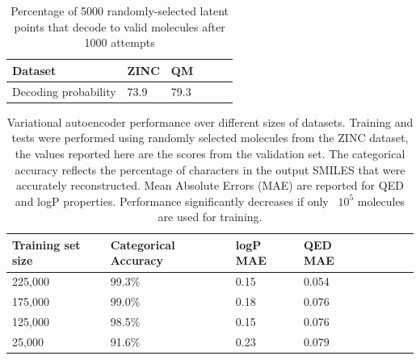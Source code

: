 \begin{table}[h]
\centering
\begin{tabular}{lp{1cm}lp{1cm}lp{1cm}}
\hline
Dataset & ZINC & QM \\
\hline
Decoding probability & 73.9 & 79.3 \\
\hline
\end{tabular}
\caption{Percentage of 5000 randomly-selected latent points that decode to valid molecules after 1000 attempts}
\label{tab:random_sampling_statistics}
\end{table}


\begin{table}[h]
\centering
\begin{tabular}{lp{1cm}lp{1cm}lp{1cm}lp{1cm}}
\hline
Training set size &  Categorical Accuracy & logP MAE & QED MAE\\
\hline
225,000 & 99.3\% & 0.15 & 0.054 \\
\hline
175,000 & 99.0\% & 0.18 & 0.076 \\
\hline
125,000 & 98.5\% & 0.15 & 0.076 \\
\hline
25,000 & 91.6\% & 0.23 & 0.079 \\
\hline
\end{tabular}
\caption{ Variational autoencoder performance over different sizes of datasets. Training and tests were performed using randomly selected molecules from the ZINC dataset, the values reported here are the scores from the validation set. The categorical accuracy reflects the percentage of characters in the output SMILES that were accurately reconstructed. Mean Absolute Errors (MAE) are reported for QED and logP properties. Performance significantly decreases if only ~$10^5$ molecules are used for training.}
\label{tab:Accuracy_by_training_size}
\end{table}

